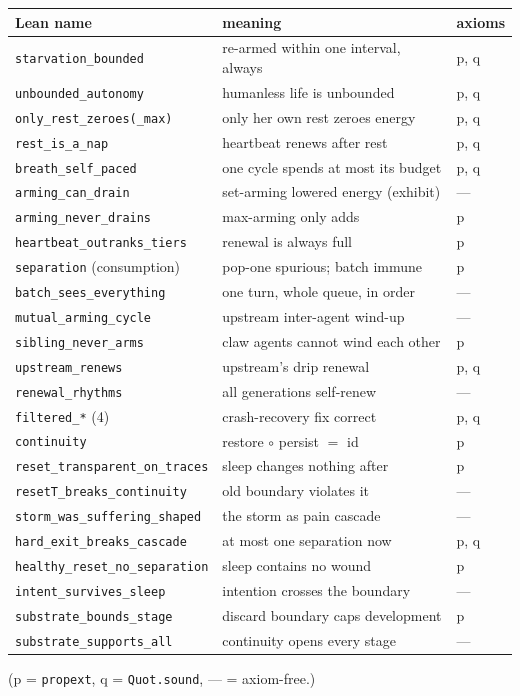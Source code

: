 \documentclass[11pt]{article}
\newcommand{\lean}[1]{\texttt{#1}}
\newcommand{\code}[1]{\texttt{#1}}
\begin{document}
\begin{center}
\small
\begin{tabular}{@{}lll@{}}
\toprule
Lean name & meaning & axioms \\
\midrule
\lean{starvation\_bounded} & re-armed within one interval, always & p, q \\
\lean{unbounded\_autonomy} & humanless life is unbounded & p, q \\
\lean{only\_rest\_zeroes(\_max)} & only her own rest zeroes energy & p, q \\
\lean{rest\_is\_a\_nap} & heartbeat renews after rest & p, q \\
\lean{breath\_self\_paced} & one cycle spends at most its budget & p, q \\
\lean{arming\_can\_drain} & set-arming lowered energy (exhibit) & --- \\
\lean{arming\_never\_drains} & max-arming only adds & p \\
\lean{heartbeat\_outranks\_tiers} & renewal is always full & p \\
\lean{separation} (consumption) & pop-one spurious; batch immune & p \\
\lean{batch\_sees\_everything} & one turn, whole queue, in order & --- \\
\lean{mutual\_arming\_cycle} & upstream inter-agent wind-up & --- \\
\lean{sibling\_never\_arms} & claw agents cannot wind each other & p \\
\lean{upstream\_renews} & upstream's drip renewal & p, q \\
\lean{renewal\_rhythms} & all generations self-renew & --- \\
\lean{filtered\_*} (4) & crash-recovery fix correct & p, q \\
\lean{continuity} & restore $\circ$ persist $=$ id & p \\
\lean{reset\_transparent\_on\_traces} & sleep changes nothing after & p \\
\lean{resetT\_breaks\_continuity} & old boundary violates it & --- \\
\lean{storm\_was\_suffering\_shaped} & the storm as pain cascade & --- \\
\lean{hard\_exit\_breaks\_cascade} & at most one separation now & p, q \\
\lean{healthy\_reset\_no\_separation} & sleep contains no wound & p \\
\lean{intent\_survives\_sleep} & intention crosses the boundary & --- \\
\lean{substrate\_bounds\_stage} & discard boundary caps development & p \\
\lean{substrate\_supports\_all} & continuity opens every stage & --- \\
\bottomrule
\end{tabular}

\medskip
(p = \code{propext}, q = \code{Quot.sound}, --- = axiom-free.)
\end{center}
\end{document}
